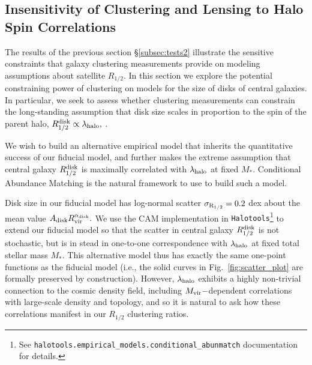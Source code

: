\documentclass[usenatbib,usegraphicx,letterpaper]{mn2e}
\newcommand{\rhalf}{R_{1/2}}
\newcommand{\rhalfdisk}{R_{1/2}^{\rm disk}}
\newcommand{\adisk}{A_{\rm disk}}
\newcommand{\alphadisk}{\alpha_{\rm disk}}
\newcommand{\sigmarhalf}{\sigma_{\rm R_{1/2}}}
\newcommand{\rvir}{R_{\rm vir}}
\newcommand{\mstar}{M_{\ast}}
\newcommand{\halospin}{\lambda_{\rm halo}}
\newcommand{\mvir}{M_{\rm vir}}
\begin{document}
\subsection{Insensitivity of Clustering and Lensing to Halo Spin Correlations}
\label{subsec:tests3}

The results of the previous section \S\ref{subsec:tests2} illustrate the sensitive constraints that galaxy clustering measurements provide on modeling assumptions about satellite $\rhalf.$ In this section we explore the potential constraining power of clustering on models for the size of disks of central galaxies. In particular, we seek to assess whether clustering measurements can constrain the long-standing assumption that disk size scales in proportion to the spin of the parent halo, $\rhalfdisk\propto\halospin,$ \citep[e.g.,][]{mo_mao_white98}.

We wish to build an alternative empirical model that inherits the quantitative success of our fiducial model, and further makes the extreme assumption that central galaxy $\rhalfdisk$ is maximally correlated with $\halospin$ at fixed $\mstar.$ Conditional Abundance Matching \citep[hereafter, CAM,][]{hearin_etal13b} is the natural framework to use to build such a model.

Disk size in our fiducial model has log-normal scatter $\sigmarhalf=0.2$ dex about the mean value $\adisk\rvir^{\alphadisk}.$  We use the CAM implementation in {\tt Halotools}\footnote{See {\tt halotools.empirical\_models.conditional\_abunmatch} documentation for details.} to extend our fiducial model so that the scatter in central galaxy $\rhalfdisk$ is not stochastic, but is in stead in one-to-one correspondence with $\halospin$ at fixed total stellar mass $\mstar.$ This alternative model thus has exactly the same one-point functions as the fiducial model (i.e., the solid curves in Fig.~\ref{fig:scatter_plot} are formally preserved by construction). However, $\halospin$ exhibits a highly non-trivial connection to the cosmic density field, including $\mvir-$dependent correlations with large-scale density and topology, and so it is natural to ask how these correlations manifest in our $\rhalf$ clustering ratios.
\end{document}

